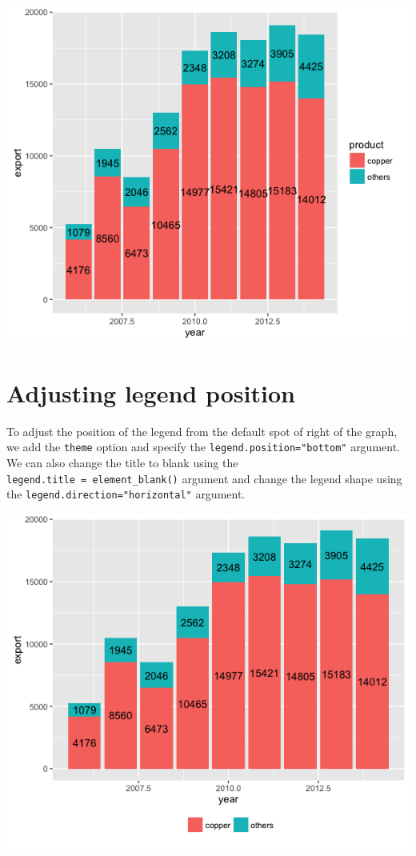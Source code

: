 \begin{center}\includegraphics[width=0.55\linewidth]{0_all_posts_pdf/bar_3-1} \end{center}

\section{Adjusting legend
position}\label{adjusting-legend-position-1}

To adjust the position of the legend from the default spot of right of
the graph, we add the \texttt{theme} option and specify the
\texttt{legend.position="bottom"} argument. We can also change the title
to blank using the \texttt{legend.title\ =\ element\_blank()} argument
and change the legend shape using the
\texttt{legend.direction="horizontal"} argument.

\begin{Shaded}
\begin{Highlighting}[]
\StringTok{ }\StringTok{ }\NormalTok{(}\NormalTok{, }\NormalTok{, }
\StringTok{        } \NormalTok{())}
\end{Highlighting}
\end{Shaded}

\begin{center}\includegraphics[width=0.55\linewidth]{0_all_posts_pdf/bar_4-1} \end{center}

